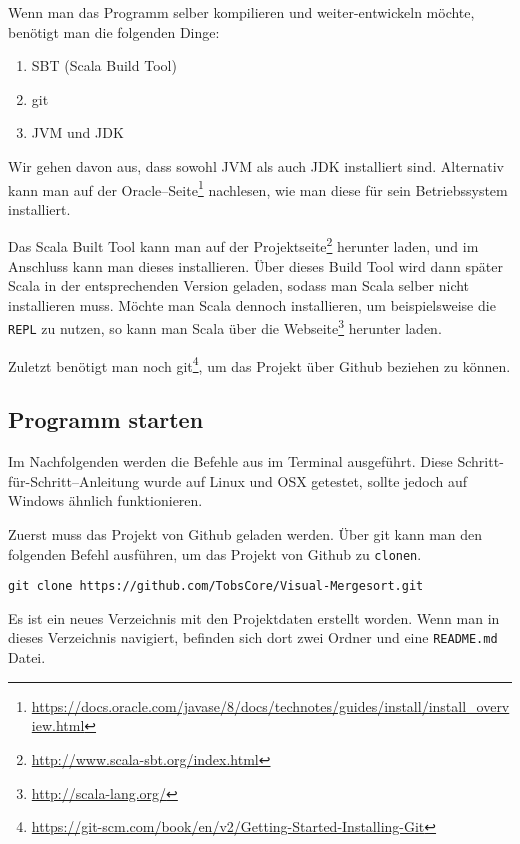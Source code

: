 Wenn man das Programm selber kompilieren und weiter-entwickeln möchte, benötigt man die folgenden Dinge:

\begin{enumerate}
\item SBT (Scala Build Tool)
\item git
\item JVM und JDK
\end{enumerate}

Wir gehen davon aus, dass sowohl JVM als auch JDK installiert sind. Alternativ kann man auf der Oracle--Seite\footnote{ \url{https://docs.oracle.com/javase/8/docs/technotes/guides/install/install_overview.html}} nachlesen, wie man diese für sein Betriebssystem installiert.

Das Scala Built Tool kann man auf der Projektseite\footnote{\url{http://www.scala-sbt.org/index.html}} herunter laden, und im Anschluss kann man dieses installieren. Über dieses Build Tool wird dann später Scala in der entsprechenden Version geladen, sodass man Scala selber nicht installieren muss. Möchte man Scala dennoch installieren, um beispielsweise die \texttt{REPL} \cite{GettingStartedWithTheScalaREPL} zu nutzen, so kann man Scala über die Webseite\footnote{\url{http://scala-lang.org/}} herunter laden.

Zuletzt benötigt man noch git\footnote{\url{https://git-scm.com/book/en/v2/Getting-Started-Installing-Git}}, um das Projekt über Github beziehen zu können.

\subsection{Programm starten}

Im Nachfolgenden werden die Befehle aus im Terminal ausgeführt. Diese Schritt-für-Schritt--Anleitung wurde auf Linux und OSX getestet, sollte jedoch auf Windows ähnlich funktionieren.

Zuerst muss das Projekt von Github geladen werden. Über git kann man den folgenden Befehl ausführen, um das Projekt von Github zu \texttt{clonen}.

\begin{verbatim}
git clone https://github.com/TobsCore/Visual-Mergesort.git
\end{verbatim}

Es ist ein neues Verzeichnis mit den Projektdaten erstellt worden. Wenn man in dieses Verzeichnis navigiert, befinden sich dort zwei Ordner und eine \texttt{README.md} Datei.


